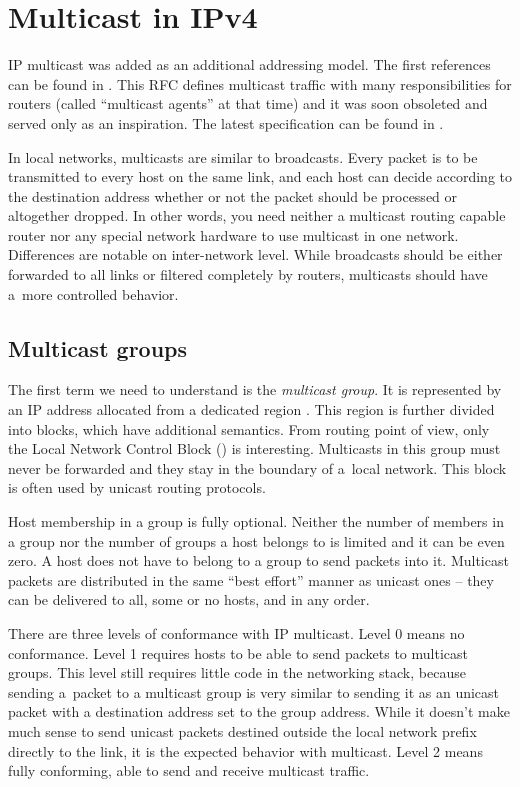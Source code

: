 \chapter{Multicast in IPv4}

IP multicast was added as an additional addressing model. The first
references can be found in . This RFC defines multicast traffic
with many responsibilities for routers (called ``multicast agents'' at that time)
and it was soon obsoleted and served only as an inspiration. The latest
specification can be found in .

In local networks, multicasts are similar to broadcasts. Every packet is to be
transmitted to every host on the same link, and each host can decide according to
the destination address whether or not the packet should be processed or altogether
dropped. In other words, you need neither a multicast routing capable router
nor any special network hardware to use multicast in one network. Differences
are notable on inter-network level. While broadcasts should be either forwarded
to all links or filtered completely by routers, multicasts should have a~more
controlled behavior.

\section{Multicast groups}

The first term we need to understand is the \emph{multicast group}. It is represented by an IP
address allocated from a dedicated region . This region is further
divided into blocks, which have additional semantics. From routing point of
view, only the Local Network Control Block () is
interesting. Multicasts in this group must never be forwarded and they stay
in the boundary of a~local network. This block is often used by unicast
routing protocols.

Host membership in a group is fully optional. Neither the number of members in
a group nor the number of groups a host belongs to is limited and it can be even
zero. A host does not have to belong to a group to send packets into it.
Multicast packets are distributed in the same ``best effort'' manner as unicast ones -- they can
be delivered to all, some or no hosts, and in any order.

There are three levels of conformance with IP multicast. Level 0 means no
conformance. Level 1 requires hosts to be able to send packets to multicast
groups. This level still requires little code in the networking stack, because
sending a~packet to a multicast group is very similar to sending it as an unicast
packet with a destination address set to the group address. While it doesn't make much
sense to send unicast packets destined outside the local network prefix directly
to the link, it is the expected behavior with multicast. Level 2 means fully
conforming, able to send and receive multicast traffic.

